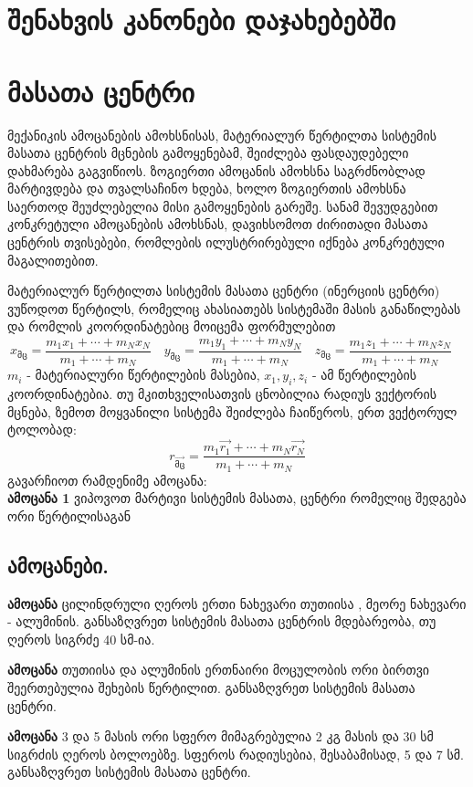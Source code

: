 \documentclass[a4paper]{book}
\begin{document}
\section{შენახვის კანონები დაჯახებებში}

\section{მასათა ცენტრი}
მექანიკის ამოცანების ამოხსნისას, მატერიალურ წერტილთა სისტემის მასათა ცენტრის მცნების გამოყენებამ, შეიძლება ფასდაუდებელი დახმარება გაგვიწიოს. ზოგიერთი ამოცანის ამოხსნა საგრძნობლად მარტივდება და თვალსაჩინო ხდება, ხოლო ზოგიერთის ამოხსნა საერთოდ შეუძლებელია მისი გამოყენების გარეშე. სანამ შევუდგებით კონკრეტული ამოცანების ამოხსნას, დავიხსომოთ ძირითადი მასათა ცენტრის თვისებები, რომლების ილუსტრირებული იქნება კონკრეტული მაგალითებით.

მატერიალურ წერტილთა სისტემის მასათა ცენტრი (ინერციის ცენტრი) ვუწოდოთ წერტილს, რომელიც ახასიათებს სისტემაში მასის განაწილებას და რომლის კოორდინატებიც მოიცემა ფორმულებით
	\begin{equation}
		x_{\text{მც}} = \frac{m_1x_1 + \dotsb + m_Nx_N}{m_1 + \dotsb + m_N} \quad
		y_{\text{მც}} = \frac{m_1y_1 + \dotsb + m_Ny_N}{m_1 + \dotsb + m_N} \quad
		z_{\text{მც}} = \frac{m_1z_1 + \dotsb + m_Nz_N}{m_1 + \dotsb + m_N} \quad
	\end{equation}
$m_i$ - მატერიალური წერტილების მასებია, $x_1,y_i,z_i$ - ამ წერტილების კოორდინატებია. თუ მკითხველისათვის ცნობილია რადიუს ვექტორის მცნება, ზემოთ მოყვანილი სისტემა შეიძლება ჩაიწეროს, ერთ ვექტორულ ტოლობად:
	\begin{equation}
		r_{\vec{\text{მც}}} = \frac{m_1\vec{r_1} + \dotsb + m_N\vec{r_N}}{m_1 + \dotsb + m_N}
	\end{equation}
გავარჩიოთ რამდენიმე ამოცანა:\\
\textbf{ამოცანა 1} ვიპოვოთ მარტივი სისტემის მასათა, ცენტრი რომელიც შედგება ორი წერტილისაგან


\subsection{ამოცანები.}
\textbf{ამოცანა} ცილინდრული ღეროს ერთი ნახევარი თუთიისა , მეორე ნახევარი - ალუმინის. განსაზღვრეთ სისტემის მასათა ცენტრის მდებარეობა, თუ ღეროს სიგრძე 40 სმ-ია.

\textbf{ამოცანა} თუთიისა და ალუმინის ერთნაირი მოცულობის ორი ბირთვი შეერთებულია შეხების წერტილით. განსაზღვრეთ სისტემის მასათა ცენტრი.

\textbf{ამოცანა} 3 და 5 მასის ორი სფერო მიმაგრებულია 2 კგ მასის და 30 სმ სიგრძის ღეროს ბოლოებზე. სფეროს რადიუსებია, შესაბამისად, 5 და 7 სმ. განსაზღვრეთ სისტემის მასათა ცენტრი.
\end{document}
